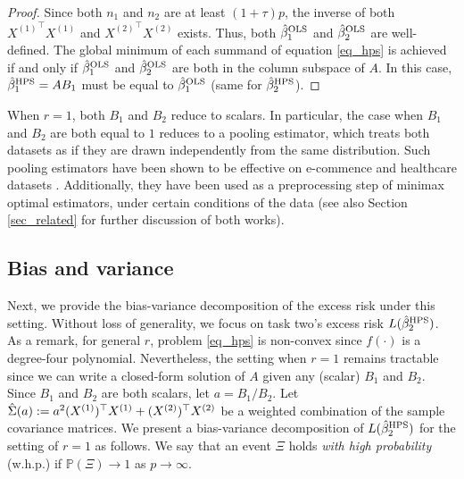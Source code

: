 \begin{proof}
    Since both $n_1$ and $n_2$ are at least $(1 + \tau) p$, the inverse of both ${X^{(1)}}^{\top} X^{(1)}$ and ${X^{(2)}}^{\top} X^{(2)}$ exists.
    Thus, both $\hat{\beta}_1^{\textup{OLS}}$ and $\hat{\beta}_2^{\textup{OLS}}$ are well-defined.
    The global minimum of each summand of equation \eqref{eq_hps} is achieved if and only if $\hat{\beta}_1^{\textup{OLS}}$ and $\hat{\beta}_2^{\textup{OLS}}$ are both in the column subspace of $A$.
    In this case, $\hat{\beta}_1^{\textup{HPS}} = A B_1$ must be equal to $\hat{\beta}_1^{\textup{OLS}}$ (same for $\hat{\beta}_2^{\textup{HPS}}$).
\end{proof}

When $r = 1$, both $B_1$ and $B_2$ reduce to scalars.
In particular, the case when $B_1$ and $B_2$ are both equal to $1$ reduces to a pooling estimator, which treats both datasets as if they are drawn independently from the same distribution.
Such pooling estimators have been shown to be effective on e-commence and healthcare datasets \cite{bastani2020predicting}.
Additionally, they have been used as a preprocessing step of minimax optimal estimators, under certain conditions of the data \cite{li2020transfer} (see also Section \ref{sec_related} for further discussion of both works).



\subsection{Bias and variance}


Next, we provide the bias-variance decomposition of the excess risk under this setting.
Without loss of generality, we focus on task two's excess risk $L(\hat{\beta}^{\textup{HPS}}_2)$.
As a remark, for general $r$, problem \eqref{eq_hps} is non-convex since $f(\cdot)$ is a degree-four polynomial.
Nevertheless, the setting when $r = 1$ remains tractable since we can write a closed-form solution of $A$ given any (scalar) $B_1$ and $B_2$.
Since $B_1$ and $B_2$ are both scalars, let $a = B_1 / B_2$.
Let $\hat{\Sigma}(a) := a^2 (X^{(1)})^{\top} X^{(1)} + (X^{(2)})^{\top} X^{(2)}$ be a weighted combination of the sample covariance matrices.
We present a bias-variance decomposition of $L(\hat{\beta}^{\textup{HPS}}_2)$ for the setting of $r = 1$ as follows.
We say that an event $\Xi$ holds \emph{with high probability} (w.h.p.) if $\mathbb P(\Xi)\to 1$ as $p\to \infty$.

